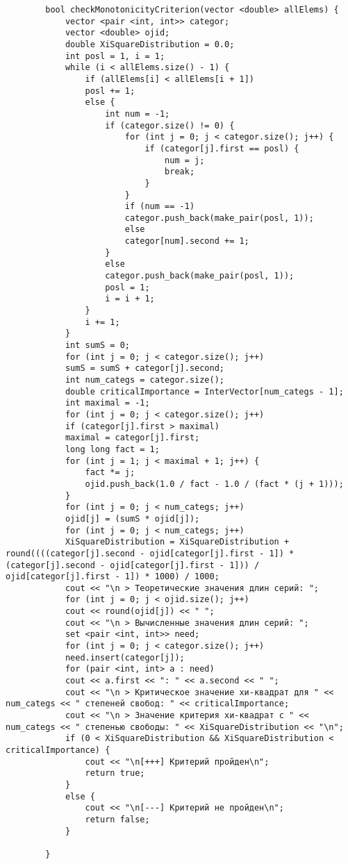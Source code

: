 \documentclass[bachelor, och, coursework]{shiza}
\begin{document}
\begin{verbatim}
		bool checkMonotonicityCriterion(vector <double> allElems) {
			vector <pair <int, int>> categor;
			vector <double> ojid;
			double XiSquareDistribution = 0.0;
			int posl = 1, i = 1;
			while (i < allElems.size() - 1) {
				if (allElems[i] < allElems[i + 1])
				posl += 1;
				else {
					int num = -1;
					if (categor.size() != 0) {
						for (int j = 0; j < categor.size(); j++) {
							if (categor[j].first == posl) {
								num = j;
								break;
							}
						}
						if (num == -1)
						categor.push_back(make_pair(posl, 1));
						else
						categor[num].second += 1;
					}
					else
					categor.push_back(make_pair(posl, 1));
					posl = 1;
					i = i + 1;
				}
				i += 1;
			}
			int sumS = 0;
			for (int j = 0; j < categor.size(); j++)
			sumS = sumS + categor[j].second;
			int num_categs = categor.size();
			double criticalImportance = InterVector[num_categs - 1];
			int maximal = -1;
			for (int j = 0; j < categor.size(); j++)
			if (categor[j].first > maximal)
			maximal = categor[j].first;
			long long fact = 1;
			for (int j = 1; j < maximal + 1; j++) {
				fact *= j;
				ojid.push_back(1.0 / fact - 1.0 / (fact * (j + 1)));
			}
			for (int j = 0; j < num_categs; j++)
			ojid[j] = (sumS * ojid[j]);
			for (int j = 0; j < num_categs; j++)
			XiSquareDistribution = XiSquareDistribution + round((((categor[j].second - ojid[categor[j].first - 1]) * (categor[j].second - ojid[categor[j].first - 1])) / ojid[categor[j].first - 1]) * 1000) / 1000;
			cout << "\n > Теоретические значения длин серий: ";
			for (int j = 0; j < ojid.size(); j++)
			cout << round(ojid[j]) << " ";
			cout << "\n > Вычисленные значения длин серий: ";
			set <pair <int, int>> need;
			for (int j = 0; j < categor.size(); j++)
			need.insert(categor[j]);
			for (pair <int, int> a : need)
			cout << a.first << ": " << a.second << " ";
			cout << "\n > Критическое значение хи-квадрат для " << num_categs << " степеней свобод: " << criticalImportance;
			cout << "\n > Значение критерия хи-квадрат с " << num_categs << " степенью свободы: " << XiSquareDistribution << "\n";
			if (0 < XiSquareDistribution && XiSquareDistribution < criticalImportance) {
				cout << "\n[+++] Критерий пройден\n";
				return true;
			}
			else {
				cout << "\n[---] Критерий не пройден\n";
				return false;
			}
			
		}
		

\end{verbatim}
\end{document}
